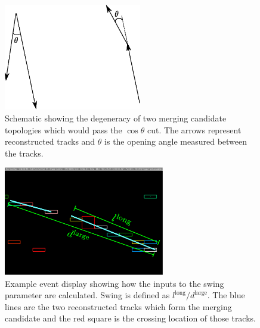 \begin{figure}
  \centering
  \includegraphics[width=6cm]{images/selection/vertex_recon/TrackMergingCosThetaDegeneracySchematic.eps}
  \caption{Schematic showing the degeneracy of two merging candidate topologies which would pass the $\cos\theta$ cut.  The arrows represent reconstructed tracks and $\theta$ is the opening angle measured between the tracks.}
  \label{fig:TrackMergingCosThetaDegeneracySchematic}
\end{figure}
\begin{figure}
  \centering
  \includegraphics[width=7cm]{images/selection/vertex_recon/track_merging_event_display_swing.eps}
  \caption{Example event display showing how the inputs to the swing parameter are calculated.  Swing is defined as $l^{\textrm{long}}/d^{\textrm{large}}$.  The blue lines are the two reconstructed tracks which form the merging candidate and the red square is the crossing location of those tracks.}
  \label{fig:TrackMergingEventDisplaySwing}
\end{figure}
